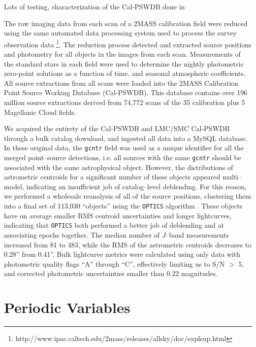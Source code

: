 \documentclass[]{emulateapj}
\begin{document}
Lots of testing, characterization of the Cal-PSWDB done in \citep{plavchanphd,plavchan2008a}

The raw imaging data from each scan of a 2MASS calibration field were reduced using the same automated data processing system used to process the survey observation data \footnote{http://www.ipac.caltech.edu/2mass/releases/allsky/doc/explsup.html}. The reduction process detected and extracted source positions and photometry for all objects in the images from each scan. Measurements of the standard stars in each field were used to determine the nightly photometric zero-point solutions as a function of time, and seasonal atmospheric coefficients. All source extractions from all scans were loaded into the 2MASS Calibration Point Source Working Database (Cal-PSWDB). This database contains over 196 million source extractions derived from 74,772 scans of the 35 calibration plus 5 Magellanic Cloud fields. 

We acquired the entirety of the Cal-PSWDB and LMC/SMC Cal-PSWDB
through a bulk catalog download, and ingested all data into a MySQL
database.  In these original data, the {\tt gcntr} field was used as a
unique identifier for all the merged point--source detections,
i.e. all sources with the same {\tt gcntr} should be associated with
the same astrophysical object.  However, the distributions of
astrometric centroids for a significant number of these objects
appeared multi--model, indicating an insufficient job of
catalog--level deblending.  For this reason, we performed a wholesale
reanalysis of all of the source positions, clustering them into a
final set of 113,030 ``objects'' using the {\tt OPTICS} algorithm
\cite{optics}.  These objects have on average smaller RMS centroid
uncertainties and longer lightcurves, indicating that {\tt OPTICS}
both performed a better job of deblending and at associating epochs
together.  The median number of $J$--band measurements increased from
81 to 483, while the RMS of the astrometric centroids decreases to
0.28'' from 0.41''.  Bulk lightcurve metrics were calculated using
only data with photometric quality flags ``A'' through ``C'',
effectively limiting us to S/N $>$ 5, and corrected photometric
uncertainties smaller than 0.22 magnitudes.







\section{Periodic Variables}
\end{document}
